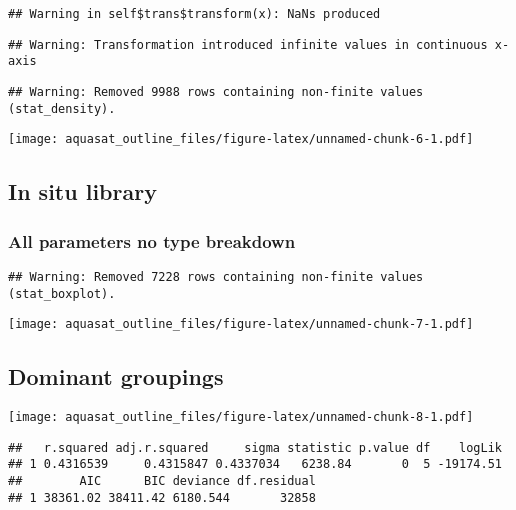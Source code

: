 \documentclass[]{article}
\begin{document}
\begin{verbatim}
## Warning in self$trans$transform(x): NaNs produced
\end{verbatim}

\begin{verbatim}
## Warning: Transformation introduced infinite values in continuous x-axis
\end{verbatim}

\begin{verbatim}
## Warning: Removed 9988 rows containing non-finite values (stat_density).
\end{verbatim}

\texttt{[image: aquasat\_outline\_files/figure-latex/unnamed-chunk-6-1.pdf]}

\hypertarget{in-situ-library}{%
\subsection{In situ library}\label{in-situ-library}}

\hypertarget{all-parameters-no-type-breakdown}{%
\subsubsection{All parameters no type
breakdown}\label{all-parameters-no-type-breakdown}}

\begin{verbatim}
## Warning: Removed 7228 rows containing non-finite values (stat_boxplot).
\end{verbatim}

\texttt{[image: aquasat\_outline\_files/figure-latex/unnamed-chunk-7-1.pdf]}

\hypertarget{dominant-groupings}{%
\subsection{Dominant groupings}\label{dominant-groupings}}

\texttt{[image: aquasat\_outline\_files/figure-latex/unnamed-chunk-8-1.pdf]}

\begin{verbatim}
##   r.squared adj.r.squared     sigma statistic p.value df    logLik
## 1 0.4316539     0.4315847 0.4337034   6238.84       0  5 -19174.51
##        AIC      BIC deviance df.residual
## 1 38361.02 38411.42 6180.544       32858
\end{verbatim}
\end{document}
